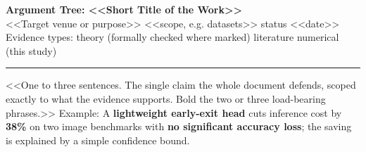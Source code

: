 \documentclass[10pt]{article}
\newcommand{\evtag}[1]{\fbox{\scriptsize\sffamily\bfseries #1}}
\newcommand{\EvT}{\evtag{T}}   %
\newcommand{\EvL}{\evtag{L}}   %
\newcommand{\EvN}{\evtag{N}}   %
\begin{document}
\begin{center}
{\sffamily\LARGE\bfseries Argument Tree: <<Short Title of the Work>>}\\[4pt]
{\small <<Target venue or purpose>> \textperiodcentered{} <<scope, e.g. datasets>> \textperiodcentered{} status <<date>>}\\[2pt]
{\footnotesize Evidence types:\enspace \EvT{} theory (formally checked where marked)\quad \EvL{} literature\quad \EvN{} numerical (this study)}
\end{center}
\vspace{-4pt}\noindent\rule{\linewidth}{0.8pt}

\begin{tcolorbox}[enhanced,sharp corners,boxrule=0.6pt,colframe=black,colback=black!5,colbacktitle=black,coltitle=white,
  title={ROOT THESIS},fonttitle=\sffamily\bfseries\footnotesize,fontupper=\small,left=5pt,right=5pt,toptitle=1pt,bottomtitle=1pt]
<<One to three sentences. The single claim the whole document defends, scoped exactly to what the evidence supports.
Bold the two or three load-bearing phrases.>>
Example: A \textbf{lightweight early-exit head} cuts inference cost by \textbf{38\%} on two image benchmarks with
\textbf{no significant accuracy loss}; the saving is explained by a simple confidence bound.
\end{tcolorbox}
\end{document}
